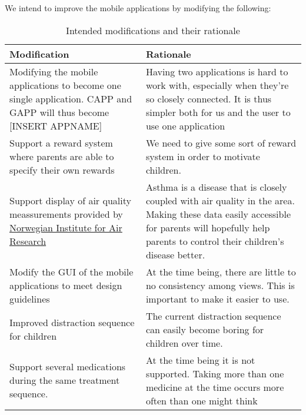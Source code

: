 We intend to improve the mobile applications by modifying the following:
\begin{table}

\begin{tabular}{| p{6.0cm} | p{7.0cm} |}
	\hline
	\textbf{Modification} & \textbf{Rationale} \\
	\hline
	Modifying the mobile applications to become one single application. CAPP and GAPP will thus become [INSERT APPNAME] 
	&
	Having two applications is hard to work with, especially when they're so closely connected. It is thus simpler both for us and the user to use one application
	\\ \hline
	Support a reward system where parents are able to specify their own rewards
	&
	We need to give some sort of reward system in order to motivate children. 
	\\ \hline
	Support display of air quality meassurements provided by \href{http://luftkvalitet.info}{Norwegian Institute for Air Research}
	&
	Asthma is a disease that is closely coupled with air quality in the area. Making these data easily accessible for parents will hopefully help parents to control their children's disease better.  
	\\ \hline
	Modify the GUI of the mobile applications to meet design guidelines
	&
	At the time being, there are little to no consistency among views. This is important to make it easier to use. 
	\\ \hline
	Improved distraction sequence for children
	& 
	The current distraction sequence can easily become boring for children over time.
	\\ \hline
	Support several medications during the same treatment sequence.
	&
	At the time being it is not supported. Taking more than one medicine at the time occurs more often than one might think 
	\\ \hline
\end{tabular}
\caption{Intended modifications and their rationale}
\end{table}


 